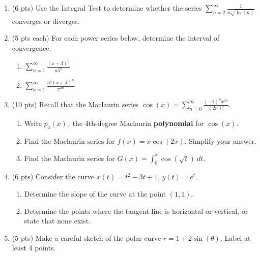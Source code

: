 \documentclass[12pt]{article}
\renewcommand{\emph}[1]{\textsf{\textbf{#1}}}
\begin{document}
\begin{enumerate}
\begin{enumerate}
	\item $\displaystyle\sum_{n=1}^{\infty} \frac{(-1)^n}{\sqrt{3n+2}}$ \hfill Test: \underline{\hspace{2in}}  \hfill Converge or Diverge\\
	\vfill
	\end{enumerate}
\newpage
\item (6 pts) Use the Integral Test to determine whether the series $\displaystyle\sum_{n=2}^{\infty} \frac{1}{n \sqrt{\ln(n)}}$ converges or diverges.
\vfill
\newpage
\item (5 pts each) For each power series below, determine the interval of convergence.
	\begin{enumerate}
	\item $\displaystyle\sum_{n=1}^{\infty} \frac{(x-3)^n}{n5^n}$
	\vfill
	\item $\displaystyle\sum_{n=1}^{\infty} \frac{n!(x+4)^n}{7^{2n}}$
	\vfill
	\end{enumerate}
\newpage
\item (10 pts) Recall that the Maclaurin series \:\:\: $\displaystyle \cos(x) = \sum_{n=0}^\infty \frac{(-1)^n x^{2n}}{(2n)!}.$
	\begin{enumerate}
	\item Write $p_4(x),$ the 4th-degree Maclaurin \emph{polynomial} for $\cos(x).$
	\vfill
	\item Find the Maclaurin series for $f(x)=x \cos(2x).$ Simplify your answer.
	\vfill
	\item Find the Maclaurin series for $G(x) = \int_0^x \cos( \sqrt{t}) \: dt.$
	\vfill
	\vfill
	\end{enumerate}
\vfill
\newpage
\item (6 pts) Consider the curve $x(t) = t^2-3t+1$, $y(t) = e^t.$
\begin{enumerate}[label=(\alph*)]
\item Determine the slope of the curve at the point $(1,1)$.
\vfill
\item Determine the points where the tangent line is horizontal or vertical, or state that none exist.
\vfill
\end{enumerate}
\newpage
\item (5 pts) Make a careful sketch of the polar curve $r = 1 + 2\sin(\theta)$. Label at least 4 points.\\


\end{enumerate}
\end{document}
